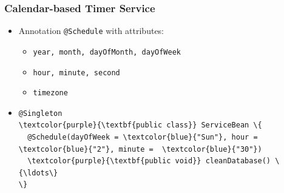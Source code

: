 \documentclass[10pt,xcolor=pdflatex]{beamer}
\begin{document}
\begin{frame}[fragile]\frametitle{Calendar-based Timer Service}
	\begin{itemize}
		\item Annotation \texttt{@Schedule} with attributes:
          \begin{itemize}
        	\item \texttt{year, month, dayOfMonth, dayOfWeek}
        	\item \texttt{hour, minute, second}
        	\item \texttt{timezone}
           \end{itemize}
         \item[]
            	\medskip
                \begin{Verbatim}[fontsize=\footnotesize, commandchars=\\\{\}]
@Singleton
\textcolor{purple}{\textbf{public class}} ServiceBean \{
  @Schedule(dayOfWeek = \textcolor{blue}{"Sun"}, hour =  \textcolor{blue}{"2"}, minute =  \textcolor{blue}{"30"})
  \textcolor{purple}{\textbf{public void}} cleanDatabase() \{\ldots\}
\}               
                \end{Verbatim}
	\end{itemize}
\end{frame}
\end{document}
